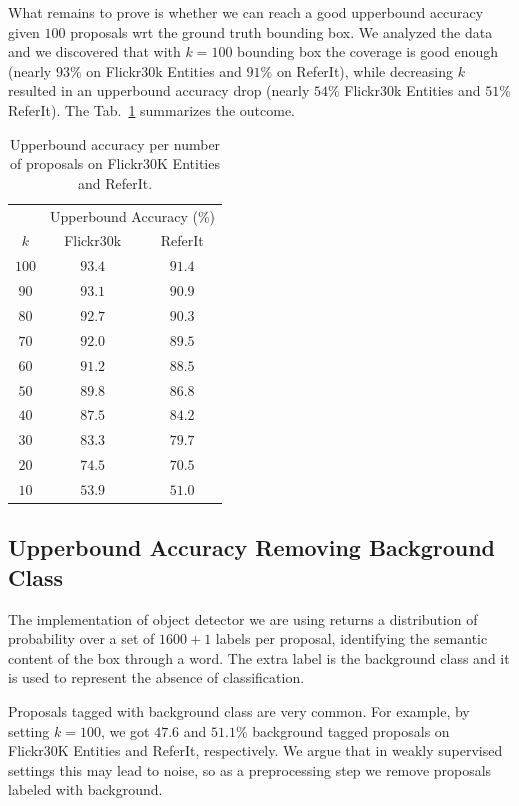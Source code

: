 What remains to prove is whether we can reach a good upperbound
accuracy given $100$ proposals wrt the ground truth bounding box. We
analyzed the data and we discovered that with $k = 100$ bounding box
the coverage is good enough (nearly $93$\% on Flickr30k Entities and
$91$\% on ReferIt), while decreasing $k$ resulted in an upperbound
accuracy drop (nearly $54$\% Flickr30k Entities and $51$\% ReferIt).
The Tab.~\ref{tab:bb-coverage} summarizes the outcome.

\begin{table}
  \centering
  \begin{tabular}{c|cc}
     & \multicolumn{2}{c}{Upperbound Accuracy (\%)} \\
    $k$ & Flickr30k & ReferIt \\\hline 
    $100$ & $93.4$ & $91.4$ \\ 
     $90$ & $93.1$ & $90.9$ \\  
     $80$ & $92.7$ & $90.3$ \\
     $70$ & $92.0$ & $89.5$ \\
     $60$ & $91.2$ & $88.5$ \\
     $50$ & $89.8$ & $86.8$ \\
     $40$ & $87.5$ & $84.2$ \\
     $30$ & $83.3$ & $79.7$ \\
     $20$ & $74.5$ & $70.5$ \\
     $10$ & $53.9$ & $51.0$ \\\hline
  \end{tabular}
  \caption[Upperbound accuracy per number of proposals on Flickr30K Entities and ReferIt]{Upperbound accuracy per number of proposals on Flickr30K Entities and ReferIt.}
  \label{tab:bb-coverage}
\end{table}

\subsection{Upperbound Accuracy Removing Background Class}

The implementation of object detector we are using
\cite{anderson2018bottom} returns a distribution of probability over a
set of $1600 + 1$ labels per proposal, identifying the semantic
content of the box through a word. The extra label is the background
class and it is used to represent the absence of classification.

Proposals tagged with background class are very common. For example,
by setting $k = 100$, we got $47.6$ and $51.1$\% background tagged
proposals on Flickr30K Entities and ReferIt, respectively. We argue
that in weakly supervised settings this may lead to noise, so as a
preprocessing step we remove proposals labeled with background.

